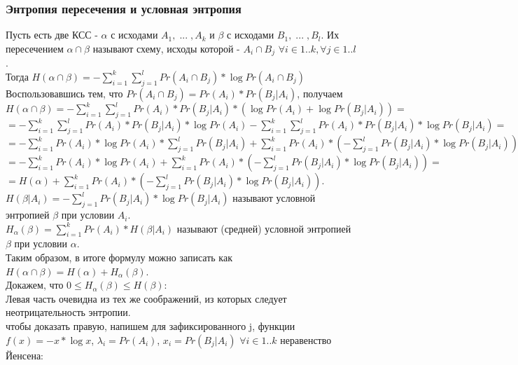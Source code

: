 \subsubsection{Энтропия пересечения и условная энтропия}
Пусть есть две КСС - $\alpha$ с исходами $A_1, \; ... \; , A_k$ и $\beta$ с исходами $B_1, \; ... \; , B_l$. Их пересечением $\alpha \cap \beta$ называют схему, исходы которой - $A_i \cap B_j$ $\forall i \in 1..k, \forall j \in 1..l$.\\
Тогда $H(\alpha \cap \beta) = -\sum\limits_{i = 1}^k \sum\limits_{j = 1}^l Pr(A_i \cap B_j) * \log Pr(A_i \cap B_j)$\\
Воспользовавшись тем, что $Pr(A_i \cap B_j) = Pr(A_i) * Pr(B_j | A_i)$, получаем\\
$H(\alpha \cap \beta) = -\sum\limits_{i = 1}^k \sum\limits_{j = 1}^l Pr(A_i) * Pr(B_j | A_i) * (\log Pr(A_i) + \log Pr(B_j | A_i)) =$ \\ 
$ = -\sum\limits_{i = 1}^k \sum\limits_{j = 1}^l Pr(A_i) * Pr(B_j | A_i) * \log Pr(A_i) - \sum\limits_{i = 1}^k \sum\limits_{j = 1}^l Pr(A_i) * Pr(B_j | A_i) * \log Pr(B_j | A_i) = $\\
$ = -\sum\limits_{i = 1}^k Pr(A_i) * \log Pr(A_i) * \sum\limits_{j = 1}^l Pr(B_j | A_i) + \sum\limits_{i = 1}^k  Pr(A_i) * (-\sum\limits_{j = 1}^l Pr(B_j | A_i) * \log Pr(B_j | A_i)) = $\\
$ = -\sum\limits_{i = 1}^k Pr(A_i) * \log Pr(A_i) + \sum\limits_{i = 1}^k  Pr(A_i) * (-\sum\limits_{j = 1}^l Pr(B_j | A_i) * \log Pr(B_j | A_i)) = $\\
$ = H(\alpha) + \sum\limits_{i = 1}^k  Pr(A_i) * (-\sum\limits_{j = 1}^l Pr(B_j | A_i) * \log Pr(B_j | A_i))$.\\
$H(\beta | A_i) = -\sum\limits_{j = 1}^l Pr(B_j | A_i) * \log Pr(B_j | A_i)$ называют условной энтропией $\beta$ при условии $A_i$.\\
$H_{\alpha}(\beta) = \sum\limits_{i = 1}^k  Pr(A_i) * H(\beta | A_i)$ называют (средней) условной энтропией $\beta$ при условии $\alpha$.\\
Таким образом, в итоге формулу можно записать как \\
$H(\alpha \cap \beta) = H(\alpha) + H_{\alpha}(\beta)$.\\
Докажем, что  $0 \leq H_{\alpha}(\beta) \leq H(\beta)$:\\
Левая часть очевидна из тех же соображений, из которых следует неотрицательность энтропии.\\
чтобы доказать правую, напишем для зафиксированного j, функции $f(x) = -x * \log x$, $\lambda_i = Pr(A_i)$, $x_i = Pr(B_j | A_i)$ $\forall i \in 1..k$ неравенство Йенсена:\\
